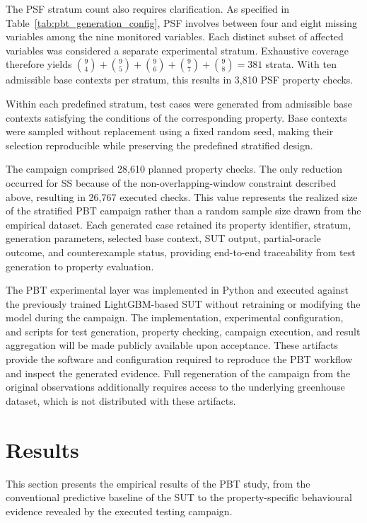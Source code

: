 \documentclass[preprint,12pt]{elsarticle}
\begin{document}
The PSF stratum count also requires clarification. As specified in
Table~\ref{tab:pbt_generation_config}, PSF involves between four and eight
missing variables among the nine monitored variables. Each distinct subset
of affected variables was considered a separate experimental stratum.
Exhaustive coverage therefore yields
\(\binom{9}{4}+\binom{9}{5}+\binom{9}{6}+\binom{9}{7}+
\binom{9}{8}=381\) strata. With ten admissible base contexts per stratum,
this results in 3,810 PSF property checks.


Within each predefined stratum, test cases were generated from admissible
base contexts satisfying the conditions of the corresponding property.
Base contexts were sampled without replacement using a fixed random seed,
making their selection reproducible while preserving the predefined
stratified design.

The campaign comprised 28,610 planned property checks. The only reduction
occurred for SS because of the non-overlapping-window constraint described
above, resulting in 26,767 executed checks. This value represents the
realized size of the stratified PBT campaign rather than a random sample
size drawn from the empirical dataset. Each generated case retained its
property identifier, stratum, generation parameters, selected base context,
SUT output, partial-oracle outcome, and counterexample status, providing
end-to-end traceability from test generation to property evaluation.

{\color{red}The PBT experimental layer was implemented in Python and executed against
the previously trained LightGBM-based SUT without retraining or modifying
the model during the campaign. The implementation, experimental
configuration, and scripts for test generation, property checking, campaign
execution, and result aggregation will be made publicly available upon
acceptance. These artifacts provide the software and configuration required
to reproduce the PBT workflow and inspect the generated evidence. Full
regeneration of the campaign from the original observations additionally
requires access to the underlying greenhouse dataset, which is not
distributed with these artifacts.
}
\section{Results}
\label{sec:results}

This section presents the empirical results of the PBT study, from the
conventional predictive baseline of the SUT to the property-specific
behavioural evidence revealed by the executed testing campaign.
\end{document}
